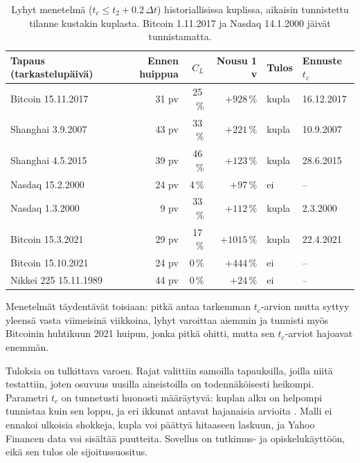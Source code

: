 \documentclass[10pt,a4paper]{article}
\newcommand{\tc}{t_c}
\begin{document}
\begin{table}[htbp]
  \centering\footnotesize
  \begin{tabular}{@{}l r r r l l@{}}
    \toprule
    Tapaus (tarkastelupäivä) & Ennen huippua & $C_L$ & Nousu 1 v & Tulos & Ennuste $\tc$ \\
    \midrule
    Bitcoin 15.11.2017    & 31 pv & 25\,\% & $+928\,\%$  & kupla & 16.12.2017 \\
    Shanghai 3.9.2007     & 43 pv & 33\,\% & $+221\,\%$  & kupla & 10.9.2007 \\
    Shanghai 4.5.2015     & 39 pv & 46\,\% & $+123\,\%$  & kupla & 28.6.2015 \\
    Nasdaq 15.2.2000      & 24 pv & 4\,\%  & $+97\,\%$   & ei    & -- \\
    Nasdaq 1.3.2000       & 9 pv  & 33\,\% & $+112\,\%$  & kupla & 2.3.2000 \\
    Bitcoin 15.3.2021     & 29 pv & 17\,\% & $+1015\,\%$ & kupla & 22.4.2021 \\
    Bitcoin 15.10.2021    & 24 pv & 0\,\%  & $+444\,\%$  & ei    & -- \\
    Nikkei 225 15.11.1989 & 44 pv & 0\,\%  & $+24\,\%$   & ei    & -- \\
    \bottomrule
  \end{tabular}
  \caption{Lyhyt menetelmä ($\tc \le t_2 + 0.2\,\Delta t$) historiallisissa kuplissa, aikaisin
    tunnistettu tilanne kustakin kuplasta. Bitcoin 1.11.2017 ja Nasdaq 14.1.2000 jäivät tunnistamatta.}
  \label{tab:lyhyt}
\end{table}

Menetelmät täydentävät toisiaan: pitkä antaa tarkemman $\tc$-arvion mutta syttyy yleensä vasta
viimeisinä viikkoina, lyhyt varoittaa aiemmin ja tunnisti myös Bitcoinin huhtikuun 2021 huipun,
jonka pitkä ohitti, mutta sen $\tc$-arviot hajoavat enemmän.

Tuloksia on tulkittava varoen. Rajat valittiin samoilla tapauksilla, joilla niitä testattiin,
joten osuvuus uusilla aineistoilla on todennäköisesti heikompi. Parametri $\tc$ on tunnetusti
huonosti määräytyvä: kuplan alku on helpompi tunnistaa kuin sen loppu, ja eri ikkunat antavat
hajanaisia arvioita \citep{zhang2016}. Malli ei ennakoi ulkoisia shokkeja, kupla voi päättyä
hitaaseen laskuun, ja Yahoo Financen data voi sisältää puutteita. Sovellus on tutkimus- ja
opiskelukäyttöön, eikä sen tulos ole sijoitussuositus.
\end{document}
